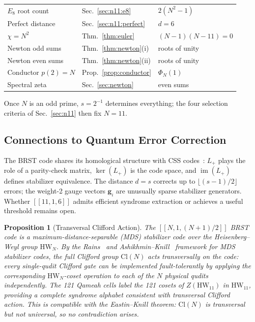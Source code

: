 \documentclass[aip,jmp,reprint,superscriptaddress,floatfix,nofootinbib]{revtex4-2}
\newtheorem{proposition}[theorem]{Proposition}
\theoremstyle{definition}
\theoremstyle{remark}
\newcommand{\HW}{\mathrm{HW}}
\begin{document}
\begin{table}[ht]
\begin{tabular}{lll}
$E_8$ root count & Sec.~\ref{sec:n11:e8} & $2(N^2{-}1)$ \\
Perfect distance & Sec.~\ref{sec:n11:perfect} & $d=6$ \\
$\chi = N^2$ & Thm.~\ref{thm:euler} & $(N{-}1)(N{-}11)=0$ \\
Newton odd sums & Thm.~\ref{thm:newton}(i) & roots of unity \\
Newton even sums & Thm.~\ref{thm:newton}(ii) & roots of unity \\
Conductor $p(2) = N$ & Prop.~\ref{prop:conductor} & $\Phi_N(1)$ \\
Spectral zeta & Sec.~\ref{sec:newton} & even sums \\
\bottomrule
\end{tabular}
\end{table}

Once $N$ is an odd prime, $s = 2^{-1}$ determines everything; the
four selection criteria of Sec.~\ref{sec:n11} then fix $N = 11$.

\subsection{Connections to Quantum Error Correction}
\label{sec:disc:qec}

The BRST code shares its homological structure with CSS
codes~\cite{Gottesman1997, NebeRainsSloane2006, Kitaev2003}: $L_+$ plays the role of a parity-check
matrix, $\ker(L_+)$ is the code space, and $\operatorname{im}(L_+)$
defines stabilizer equivalence.  The distance $d = s$ corrects up to
$\lfloor(s{-}1)/2\rfloor$ errors; the weight-2 gauge vectors
$\mathbf{g}_i$ are unusually sparse stabilizer generators.  Whether
$[[11,1,6]]$ admits efficient syndrome extraction or achieves a
useful threshold remains open.

\begin{proposition}[Transversal Clifford Action]\label{prop:transversal}
The $[[N, 1, (N{+}1)/2]]$ BRST code is a maximum-distance-separable
\textup{(}MDS\textup{)} stabilizer code over the Heisenberg--Weyl group
$\HW_N$.  By the Rains~\cite{Rains1999} and Ashikhmin--Knill~\cite{AshikhminKnill2001}
framework for MDS stabilizer codes, the full Clifford group $\mathrm{Cl}(N)$
acts transversally on the code: every single-qudit Clifford gate can be
implemented fault-tolerantly by applying the corresponding $\HW_N$-coset
operation to each of the $N$ physical qudits independently.  The 121
Qameah cells label the 121 cosets of $Z(\HW_{11})$ in $\HW_{11}$,
providing a complete syndrome alphabet consistent with transversal Clifford
action.  This is compatible with the Eastin--Knill theorem: $\mathrm{Cl}(N)$
is transversal but not universal, so no contradiction arises.
\end{proposition}
\end{document}

